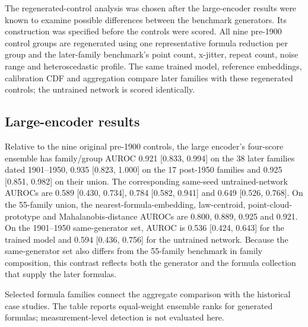 \documentclass{article}
\begin{document}
The regenerated-control analysis was chosen after the large-encoder results were known to examine possible differences between the benchmark generators. Its construction was specified before the controls were scored. All nine pre-1900 control groups are regenerated using one representative formula reduction per group and the later-family benchmark's point count, x-jitter, repeat count, noise range and heteroscedastic profile. The same trained model, reference embeddings, calibration CDF and aggregation compare later families with these regenerated controls; the untrained network is scored identically.

\subsection{Large-encoder results}

Relative to the nine original pre-1900 controls, the large encoder's four-score ensemble has family/group AUROC 0.921 [0.833, 0.994] on the 38 later families dated 1901--1950, 0.935 [0.823, 1.000] on the 17 post-1950 families and 0.925 [0.851, 0.982] on their union. The corresponding same-seed untrained-network AUROCs are 0.589 [0.430, 0.734], 0.784 [0.582, 0.941] and 0.649 [0.526, 0.768]. On the 55-family union, the nearest-formula-embedding, law-centroid, point-cloud-prototype and Mahalanobis-distance AUROCs are 0.800, 0.889, 0.925 and 0.921. On the 1901--1950 same-generator set, AUROC is 0.536 [0.424, 0.643] for the trained model and 0.594 [0.436, 0.756] for the untrained network. Because the same-generator set also differs from the 55-family benchmark in family composition, this contrast reflects both the generator and the formula collection that supply the later formulas.

Selected formula families connect the aggregate comparison with the historical case studies. The table reports equal-weight ensemble ranks for generated formulas; measurement-level detection is not evaluated here.
\end{document}
